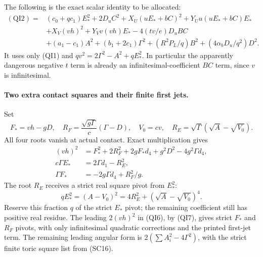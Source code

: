 The following is the exact scalar identity to be allocated:
\begin{align*}
 (\mathrm{QI2})={}&(c_0+qc_1)E_*^2+2D_uC^2
 +X_U(uE_*+bC)^2+Y_Uu(uE_*+bC)E_*\\
 &+X_V(vh)^2+Y_Vv(vh)E_*
 -4(t v/e)D_uBC\\
 &+(a_1-c_1)A^2+(b_1+2c_1)\Gamma^2
 +(R^2P_L/q)B^2+(4\alpha_bD_u/q^2)D^2.
 \tag{QI6}
\end{align*}
It uses only (QI1) and $qv^2=2\Gamma^2-A^2+qE_*^2$.
In particular the apparently dangerous negative $t$ term is already
an infinitesimal-coefficient $BC$ term, since $v$ is infinitesimal.

\paragraph{Two extra contact squares and their finite first jets.}
Set
\[
 F_*=vh-gD,\quad
 R_F=\frac{\sqrt{g\Gamma}}{c}(\Gamma-D),\quad
 V_0=cv,\quad R_E=\sqrt\Gamma(\sqrt A-\sqrt{V_0}).
\]
All four roots vanish at actual contact. Exact multiplication gives
\begin{align*}
 (vh)^2&=F_*^2+2R_F^2+2gF_*d_4+g^2D^2-4g^2\Gamma d_4,\\
 c\Gamma E_*&=2\Gamma d_1-R_E^2,\\
 \Gamma F_*&=-2g\Gamma d_4+R_F^2/g.
 \tag{QI7}
\end{align*}
The root $R_E$ receives a strict real square pivot from $E_*^2$:
\[
 qE_*^2=(A-V_0)^2
       =4R_E^2+(\sqrt A-\sqrt{V_0})^4.
 \tag{QI8}
\]
Reserve this fraction $q$ of the strict $E_*$ pivot; the remaining
coefficient still has positive real residue. The leading $2(vh)^2$
in (QI6), by (QI7), gives strict $F_*$ and $R_F$ pivots, with only
infinitesimal quadratic corrections and the printed first-jet term.
The remaining leading angular form is $2(\sum A_i^2-4\Gamma^2)$,
with the strict finite toric square list from (SC16).

